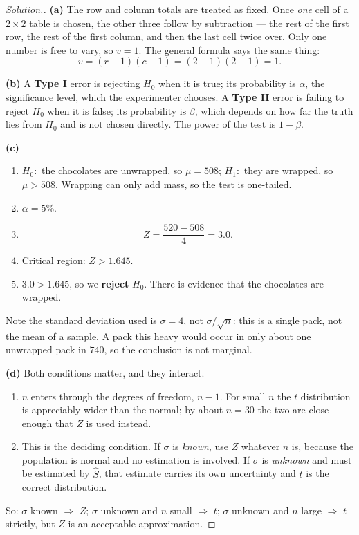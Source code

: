 \documentclass[11pt,a4paper]{article}
\theoremstyle{definition}
\newenvironment{solution}
  {\renewcommand{\qedsymbol}{}\begin{proof}[\textit{Solution}.]}
  {\end{proof}}
\begin{document}
\begin{solution}
\textbf{(a)} The row and column totals are treated as fixed. Once \emph{one} cell of a
$2\times 2$ table is chosen, the other three follow by subtraction --- the rest of the first
row, the rest of the first column, and then the last cell twice over. Only one number is free
to vary, so $v=1$. The general formula says the same thing:
\[v=(r-1)(c-1)=(2-1)(2-1)=1.\]

\textbf{(b)} A \textbf{Type I} error is rejecting $H_0$ when it is true; its probability is
$\alpha$, the significance level, which the experimenter chooses. A \textbf{Type II} error is
failing to reject $H_0$ when it is false; its probability is $\beta$, which depends on how far
the truth lies from $H_0$ and is not chosen directly. The power of the test is $1-\beta$.

\textbf{(c)}
\begin{enumerate}
\item $H_0:$ the chocolates are unwrapped, so $\mu=508$; $H_1:$ they are wrapped, so
$\mu>508$. Wrapping can only add mass, so the test is one-tailed.
\item $\alpha=5\%$.
\item \[Z=\frac{520-508}{4}=3.0.\]
\item Critical region: $Z>1.645$.
\item $3.0>1.645$, so we \textbf{reject} $H_0$. There is evidence that the chocolates are
wrapped.
\end{enumerate}
Note the standard deviation used is $\sigma=4$, not $\sigma/\sqrt{n}$: this is a single pack,
not the mean of a sample. A pack this heavy would occur in only about one unwrapped pack in
$740$, so the conclusion is not marginal.

\textbf{(d)} Both conditions matter, and they interact.
\begin{enumerate}
\item[(i).] $n$ enters through the degrees of freedom, $n-1$. For small $n$ the $t$
distribution is appreciably wider than the normal; by about $n=30$ the two are close enough
that $Z$ is used instead.
\item[(ii).] This is the deciding condition. If $\sigma$ is \emph{known}, use $Z$ whatever
$n$ is, because the population is normal and no estimation is involved. If $\sigma$ is
\emph{unknown} and must be estimated by $\widehat{S}$, that estimate carries its own
uncertainty and $t$ is the correct distribution.
\end{enumerate}
So: $\sigma$ known $\Rightarrow$ $Z$; $\sigma$ unknown and $n$ small $\Rightarrow$ $t$;
$\sigma$ unknown and $n$ large $\Rightarrow$ $t$ strictly, but $Z$ is an acceptable
approximation.
\end{solution}
\end{document}
